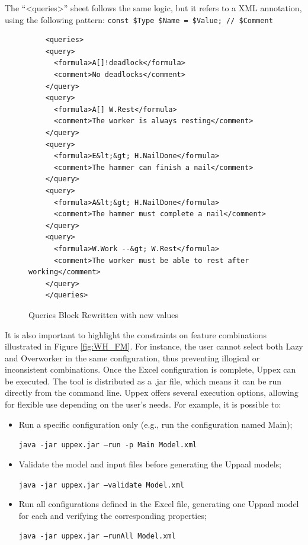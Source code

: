 The ``<queries>'' sheet follows the same logic, but it refers to a XML annotation, using the following pattern: \texttt{\footnotesize const \$Type \$Name = \$Value; // \$Comment}

\begin{figure}[H]
\centering
\begin{minipage}{0.9\linewidth}
{\footnotesize
\begin{verbatim}
    <queries>
    <query>
      <formula>A[]!deadlock</formula>
      <comment>No deadlocks</comment>
    </query>
    <query>
      <formula>A[] W.Rest</formula>
      <comment>The worker is always resting</comment>
    </query>
    <query>
      <formula>E&lt;&gt; H.NailDone</formula>
      <comment>The hammer can finish a nail</comment>
    </query>
    <query>
      <formula>A&lt;&gt; H.NailDone</formula>
      <comment>The hammer must complete a nail</comment>
    </query>
    <query>
      <formula>W.Work --&gt; W.Rest</formula>
      <comment>The worker must be able to rest after working</comment>
    </query>
    </queries>
\end{verbatim}
}
\end{minipage}
\caption{Queries Block Rewritten with new values}
\label{fig:worker-config}
\end{figure}

It is also important to highlight the constraints on feature combinations illustrated in Figure \ref{fig:WH_FM}. For instance, the user cannot select both Lazy and Overworker in the same configuration, thus preventing illogical or inconsistent combinations. Once the Excel configuration is complete, Uppex can be executed. The tool is distributed as a .jar file, which means it can be run directly from the command line. Uppex offers several execution options, allowing for flexible use depending on the user's needs. For example, it is possible to:

\begin{itemize}
    \item Run a specific configuration only (e.g., run the configuration named Main);

    \texttt{java -jar uppex.jar --run -p Main Model.xml}

    \item Validate the model and input files before generating the Uppaal models;
    
    \texttt{java -jar uppex.jar --validate Model.xml}
    
    \item Run all configurations defined in the Excel file, generating one Uppaal model for each and verifying the corresponding properties;
    
    \texttt{java -jar uppex.jar --runAll Model.xml}
\end{itemize}

